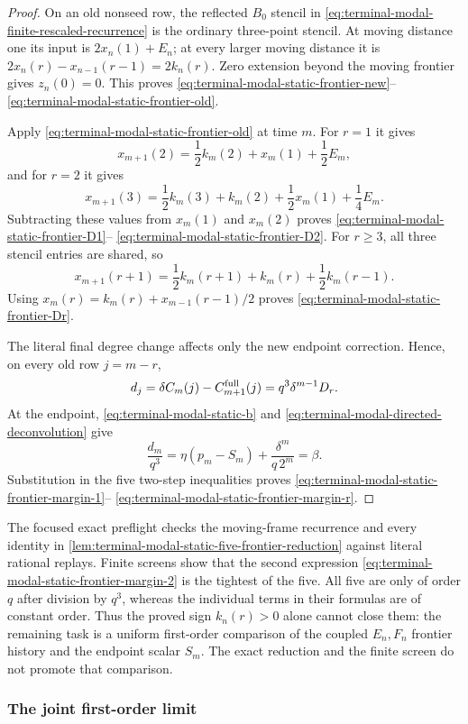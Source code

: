 \begin{proof}
On an old nonseed row, the reflected $B_0$ stencil in
\eqref{eq:terminal-modal-finite-rescaled-recurrence} is the ordinary
three-point stencil.  At moving distance one its input is
$2x_n(1)+E_n$; at every larger moving distance it is
$2x_n(r)-x_{n-1}(r-1)=2k_n(r)$.  Zero extension beyond the moving frontier
gives $z_n(0)=0$.  This proves
\eqref{eq:terminal-modal-static-frontier-new}--
\eqref{eq:terminal-modal-static-frontier-old}.

Apply \eqref{eq:terminal-modal-static-frontier-old} at time $m$.
For $r=1$ it gives
\[
 x_{m+1}(2)=\frac12k_m(2)+x_m(1)+\frac12E_m,
\]
and for $r=2$ it gives
\[
 x_{m+1}(3)=\frac12k_m(3)+k_m(2)
             +\frac12x_m(1)+\frac14E_m.
\]
Subtracting these values from $x_m(1)$ and $x_m(2)$ proves
\eqref{eq:terminal-modal-static-frontier-D1}--
\eqref{eq:terminal-modal-static-frontier-D2}.  For $r\ge3$, all three
stencil entries are shared, so
\[
 x_{m+1}(r+1)=\frac12k_m(r+1)+k_m(r)+\frac12k_m(r-1).
\]
Using $x_m(r)=k_m(r)+x_{m-1}(r-1)/2$ proves
\eqref{eq:terminal-modal-static-frontier-Dr}.

The literal final degree change affects only the new endpoint correction.
Hence, on every old row $j=m-r$,
\[
 d_j=\delta C_m(j)-C_{m+1}^{\rm full}(j)
     =q^3\delta^{m-1}D_r.
\]
At the endpoint, \eqref{eq:terminal-modal-static-b} and
\eqref{eq:terminal-modal-directed-deconvolution} give
\[
 \frac{d_m}{q^3}
 =\eta(p_m-S_m)+\frac{\delta^m}{q\,2^m}=\beta.
\]
Substitution in the five two-step inequalities proves
\eqref{eq:terminal-modal-static-frontier-margin-1}--
\eqref{eq:terminal-modal-static-frontier-margin-r}.
\end{proof}

The focused exact preflight checks the moving-frame recurrence and every
identity in \cref{lem:terminal-modal-static-five-frontier-reduction} against
literal rational replays.  Finite screens show that the second expression
\eqref{eq:terminal-modal-static-frontier-margin-2} is the tightest of the
five.  All five are only of order $q$ after division by $q^3$, whereas the
individual terms in their formulas are of constant order.  Thus the proved
sign $k_n(r)>0$ alone cannot close them: the remaining task is a uniform
first-order comparison of the coupled $E_n,F_n$ frontier history and the
endpoint scalar $S_m$.  The exact reduction and the finite screen do not
promote that comparison.

\subsubsection{The joint first-order limit}

